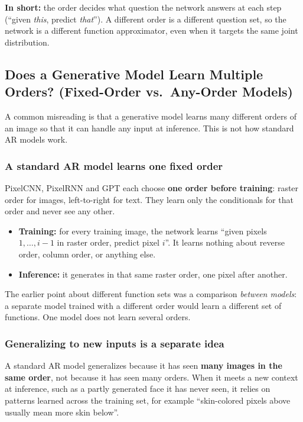 \textbf{In short:} the order decides what question the network answers at each step (``given \emph{this}, predict \emph{that}''). A different order is a different question set, so the network is a different function approximator, even when it targets the same joint distribution.

\subsection*{Does a Generative Model Learn Multiple Orders? (Fixed-Order vs.\ Any-Order Models)}

A common misreading is that a generative model learns many different orders of an image so that it can handle any input at inference. This is not how standard AR models work.

\subsubsection*{A standard AR model learns one fixed order}

PixelCNN, PixelRNN and GPT each choose \textbf{one order before training}: raster order for images, left-to-right for text. They learn only the conditionals for that order and never see any other.
\begin{itemize}
  \item \textbf{Training:} for every training image, the network learns ``given pixels $1,\dots,i-1$ in raster order, predict pixel $i$''. It learns nothing about reverse order, column order, or anything else.
  \item \textbf{Inference:} it generates in that same raster order, one pixel after another.
\end{itemize}
The earlier point about different function sets was a comparison \emph{between models}: a separate model trained with a different order would learn a different set of functions. One model does not learn several orders.

\subsubsection*{Generalizing to new inputs is a separate idea}

A standard AR model generalizes because it has seen \textbf{many images in the same order}, not because it has seen many orders. When it meets a new context at inference, such as a partly generated face it has never seen, it relies on patterns learned across the training set, for example ``skin-colored pixels above usually mean more skin below''.

